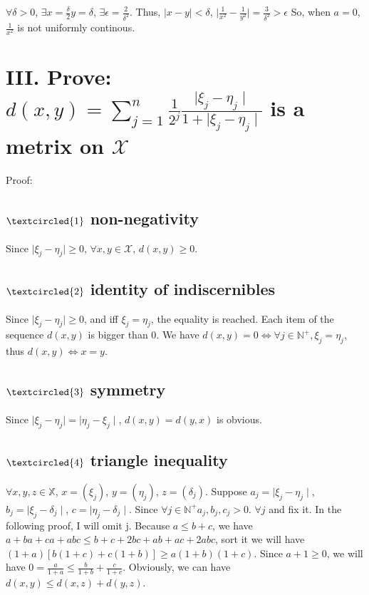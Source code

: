 \documentclass[twoside,a4paper]{article}
\begin{document}
$\forall \delta > 0$, $\exists x=\frac{\delta}{2} y=\delta$, $\exists \epsilon = \frac{2}{\delta^2}$.
Thus, $\mid x - y \mid < \delta$, $\mid \frac{1}{x^2} - \frac{1}{y^2} \mid = \frac{3}{\delta^2} > \epsilon$
So, when $a = 0$, $\frac{1}{x^2}$ is not uniformly continous.

\section*{III. \small{Prove: $d(x,y) = \sum_{j=1}^{n}\frac{1}{2^j}\frac{\mid\xi_{j} - \eta_{j}\mid}{1 + \mid\xi_{j} - \eta_{j}\mid}$ is a metrix on $\mathcal{X}$}}
Proof:

\subsection*{\small{$\textcircled{1}$ non-negativity}}

Since $\mid\xi_{j} - \eta_{j}\mid \geq 0$, $\forall x,y \in \mathcal{X}$, $d(x,y) \geq 0$.

\subsection*{\small{$\textcircled{2}$ identity of indiscernibles}} 

Since $\mid\xi_{j} - \eta_{j}\mid \geq 0$, and iff $\xi_{j} = \eta_{j}$, the equality is reached. Each item of the sequence $d(x,y)$ is bigger than 0.
We have $d(x,y) = 0 \iff \forall j \in \mathbb{N}^+, \xi_{j} = \eta_{j}$, thus $d(x,y) \iff x = y$. 

\subsection*{\small{$\textcircled{3}$ symmetry}}

Since $\mid\xi_{j} - \eta_{j}\mid = \mid\eta_{j} - \xi_{j}\mid$, $d(x,y) = d(y,x)$ is obvious.

\subsection*{\small{$\textcircled{4}$ triangle inequality}}

$\forall x,y,z \in \mathbb{X}$, $x = (\xi_{j})$, $y = (\eta_{j})$, $z = (\delta_{j})$.
Suppose $a_{j} = \mid\xi_{j} - \eta_{j}\mid$, $b_{j} = \mid\xi_{j}- \delta_{j}\mid$, $c = \mid\eta_{j} - \delta_{j}\mid$.
Since $\forall j \in \mathbb{N}^+ a_{j}, b_{j}, c_{j} > 0$. $\forall j$ and fix it. In the following proof, I will omit j.
Because $a \leq b + c$, we have $a + ba + ca + abc \leq b + c + 2bc + ab + ac + 2abc$, sort it we will have $(1 + a)[b(1 + c) + c(1 + b)] \geq a(1 + b)(1 + c)$.
Since $a + 1 \geq 0$, we will have $0 = \frac{a}{1 + a} \leq \frac{b}{1 + b} + \frac{c}{1 + c}$. Obviously, we can have $d(x,y) \leq d(x,z) + d(y,z)$.
\end{document}
